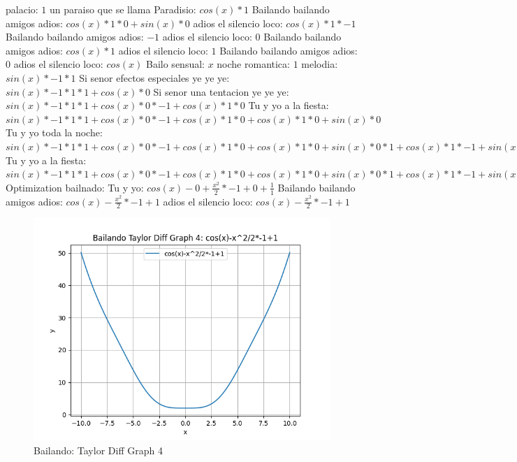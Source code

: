 \documentclass{article}
\begin{document}
palacio: $1$  \newline un paraiso que se llama Paradisio: $cos(x)*1$ Bailando bailando amigos adios: $cos(x)*1*0+sin(x)*0$ adios el silencio loco: $cos(x)*1*-1$ Bailando bailando amigos adios: $-1$ adios el silencio loco: $0$  \newline Bailando bailando amigos adios: $cos(x)*1$ adios el silencio loco: $1$ Bailando bailando amigos adios: $0$  \newline adios el silencio loco: $cos(x)$  \newline Bailo sensual: $x$ noche romantica: $1$  \newline melodia: $sin(x)*-1*1$ Si senor efectos especiales ye ye ye: $sin(x)*-1*1*1+cos(x)*0$ Si senor una tentacion ye ye ye: ${sin(x)*-1*1*1+cos(x)*0}*-1+cos(x)*1*0$ Tu y yo a la fiesta: ${sin(x)*-1*1*1+cos(x)*0}*-1+cos(x)*1*0+cos(x)*1*0+sin(x)*0$ Tu y yo toda la noche: ${{sin(x)*-1*1*1+cos(x)*0}*-1+cos(x)*1*0+cos(x)*1*0+sin(x)*0}*1+{cos(x)*1*-1+sin(x)*0}*0$ Tu y yo a la fiesta: ${{sin(x)*-1*1*1+cos(x)*0}*-1+cos(x)*1*0+cos(x)*1*0+sin(x)*0}*1+{cos(x)*1*-1+sin(x)*0}*0+{cos(x)*1*-1+sin(x)*0}*0+sin(x)*-1*0$  \newline \newline Optimization bailnado: \newline Tu y yo: $cos(x)-0+\frac{x^2}{2}*-1+0+\frac{1}{1}$  \newline Bailando bailando amigos adios: $cos(x)-\frac{x^2}{2}*-1+1$  \newline adios el silencio loco: $cos(x)-\frac{x^2}{2}*-1+1$  \newline \begin{figure}
\centering
\includegraphics[width=0.8\linewidth]{Bailando Taylor Diff Graph 4.png}
\caption{Bailando: Taylor Diff Graph 4}
\label{fig:my_image}
\end{figure}
\end{document}
